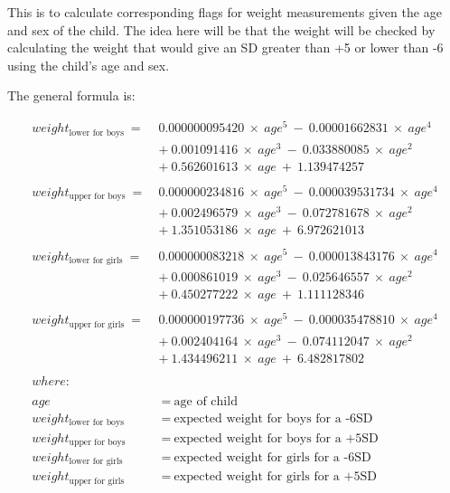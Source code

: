 \documentclass[12pt,a4paper]{article}
\theoremstyle{definition}
\theoremstyle{definition}
\theoremstyle{definition}
\theoremstyle{remark}
\begin{document}
This is to calculate corresponding flags for weight measurements given
the age and sex of the child. The idea here will be that the weight will
be checked by calculating the weight that would give an SD greater than
+5 or lower than -6 using the child's age and sex.

The general formula is:

\[\begin{aligned}
weight_\text{lower for boys} ~ = ~ & 0.000000095420 ~ \times ~ age ^ 5 ~ - ~ 0.00001662831 ~ \times ~ age ^ 4 \\
& + ~ 0.001091416 ~ \times ~ age ^ 3 ~ - ~ 0.033880085 ~ \times ~ age ^ 2 \\
& + ~ 0.562601613 ~ \times ~ age ~ + ~ 1.139474257 \\
\\
weight_\text{upper for boys} ~ = ~ &  0.000000234816 ~ \times ~ age ^ 5 ~ - ~ 0.000039531734 ~ \times ~ age ^ 4 \\
& + ~ 0.002496579 ~ \times ~ age ^ 3 ~ - ~ 0.072781678 ~ \times ~ age ^ 2 \\
& + ~ 1.351053186 ~ \times ~ age ~ + ~ 6.972621013 \\
\\
weight_\text{lower for girls} ~ = ~ & 0.000000083218 ~ \times ~ age ^ 5 ~ - ~ 0.000013843176 ~ \times ~ age ^ 4 \\
& + ~ 0.000861019 ~ \times ~ age ^ 3 ~ - ~ 0.025646557 ~ \times ~ age ^ 2 \\
& + ~ 0.450277222 ~ \times ~ age ~ + ~ 1.111128346 \\
\\
weight_\text{upper for girls} ~ = ~ & 0.000000197736 ~ \times ~ age ^ 5 ~ - ~ 0.000035478810 ~ \times ~ age ^ 4 \\
& + ~ 0.002404164 ~ \times ~ age ^ 3 ~ - ~ 0.074112047 ~ \times ~ age ^ 2 \\
& + ~ 1.434496211 ~ \times ~ age ~ + ~ 6.482817802 \\
\\
where: & \\
\\
age & ~ = ~ \text{age of child} \\
weight_\text{lower for boys} & ~ = ~ \text{expected weight for boys for a -6SD} \\
weight_\text{upper for boys} & ~ = ~ \text{expected weight for boys for a +5SD} \\
weight_\text{lower for girls} & ~ = ~ \text{expected weight for girls for a -6SD} \\
weight_\text{upper for girls} & ~ = ~ \text{expected weight for girls for a +5SD}
\end{aligned}\]
\end{document}
